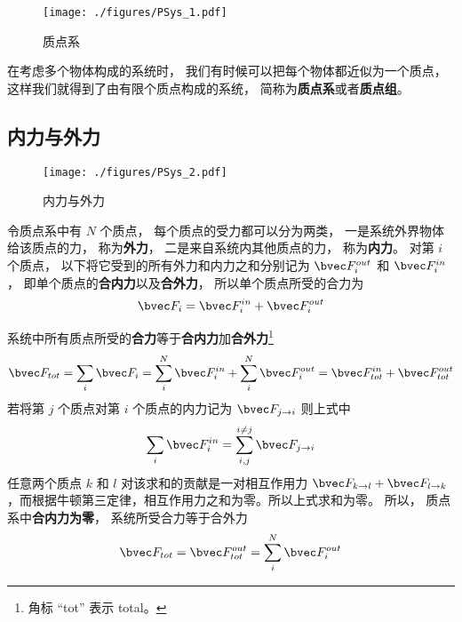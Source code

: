 
\begin{figure}[ht]
\centering
\texttt{[image: ./figures/PSys\_1.pdf]}
\caption{质点系} \label{PSys_fig1}
\end{figure}

在考虑多个物体构成的系统时， 我们有时候可以把每个物体都近似为一个质点， 这样我们就得到了由有限个质点构成的系统， 简称为\textbf{质点系}或者\textbf{质点组}。

\subsection{内力与外力}
\begin{figure}[ht]
\centering
\texttt{[image: ./figures/PSys\_2.pdf]}
\caption{内力与外力} \label{PSys_fig2}
\end{figure}
令质点系中有 $N$ 个质点， 每个质点的受力都可以分为两类， 一是系统外界物体给该质点的力， 称为\textbf{外力}， 二是来自系统内其他质点的力， 称为\textbf{内力}。 对第 $i$ 个质点， 以下将它受到的所有外力和内力之和分别记为 $\bvec F_i^{out}$ 和 $\bvec F_i^{in}$， 即单个质点的\textbf{合内力}以及\textbf{合外力}， 所以单个质点所受的合力为
\begin{equation}
\bvec F_i = \bvec F_i^{in} + \bvec F_i^{out}
\end{equation}

系统中所有质点所受的\textbf{合力}等于\textbf{合内力}加\textbf{合外力}\footnote{角标 “tot” 表示 total。}
\begin{equation}
\bvec F_{tot} = \sum_i \bvec F_i = \sum_i^N \bvec F_i^{in} + \sum_i^N \bvec F_i^{out} = \bvec F_{tot}^{in} + \bvec F_{tot}^{out}
\end{equation}
若将第 $j$ 个质点对第 $i$ 个质点的内力记为 $\bvec F_{j\to i}$ 则上式中
\begin{equation}
\sum_i \bvec F_i^{in} = \sum_{i,j}^{i \ne j} \bvec F_{j \to i}
\end{equation}
任意两个质点 $k$ 和 $l$ 对该求和的贡献是一对相互作用力 $\bvec F_{k \to l} + \bvec F_{l \to k}$，而根据牛顿第三定律，相互作用力之和为零。所以上式求和为零。 所以， 质点系中\textbf{合内力为零}， 系统所受合力等于合外力
\begin{equation}
\bvec F_{tot} = \bvec F_{tot}^{out} = \sum_i^N \bvec F_i^{out}
\end{equation}
